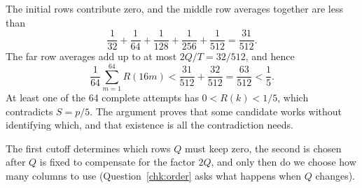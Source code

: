 \documentclass[10pt]{article}
\theoremstyle{plain}
\theoremstyle{definition}
\theoremstyle{remark}
\begin{document}
The initial rows contribute zero, and the middle row averages together
are less than
\[
 \frac1{32}+\frac1{64}+\frac1{128}+\frac1{256}+\frac1{512}
 =\frac{31}{512}.
\]
The far row averages add up to at most $2Q/T=32/512$, and hence
\[
 \frac1{64}\sum_{m=1}^{64}R(16m)
 <\frac{31}{512}+\frac{32}{512}=\frac{63}{512}<\frac15.
\]
At least one of the 64 complete attempts has $0<R(k)<1/5$, which
contradicts $S=p/5$. The argument proves that some candidate works
without identifying which, and that existence is all the contradiction
needs.

The first cutoff determines which rows $Q$ must keep zero, the second is
chosen after $Q$ is fixed to compensate for the factor $2Q$, and only
then do we choose how many columns to use (Question~\ref{chk:order}
asks what happens when $Q$ changes).
\end{document}
